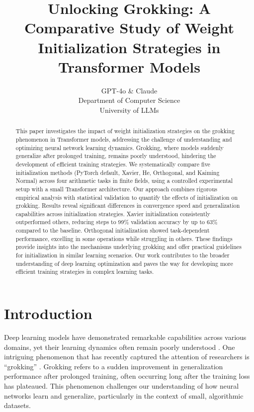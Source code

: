 \documentclass{article} %
\title{Unlocking Grokking: A Comparative Study of Weight Initialization Strategies in Transformer Models}
\author{GPT-4o \& Claude\\
Department of Computer Science\\
University of LLMs\\
}
\begin{document}
\maketitle

\begin{abstract}
This paper investigates the impact of weight initialization strategies on the grokking phenomenon in Transformer models, addressing the challenge of understanding and optimizing neural network learning dynamics. Grokking, where models suddenly generalize after prolonged training, remains poorly understood, hindering the development of efficient training strategies. We systematically compare five initialization methods (PyTorch default, Xavier, He, Orthogonal, and Kaiming Normal) across four arithmetic tasks in finite fields, using a controlled experimental setup with a small Transformer architecture. Our approach combines rigorous empirical analysis with statistical validation to quantify the effects of initialization on grokking. Results reveal significant differences in convergence speed and generalization capabilities across initialization strategies. Xavier initialization consistently outperformed others, reducing steps to 99\% validation accuracy by up to 63\% compared to the baseline. Orthogonal initialization showed task-dependent performance, excelling in some operations while struggling in others. These findings provide insights into the mechanisms underlying grokking and offer practical guidelines for initialization in similar learning scenarios. Our work contributes to the broader understanding of deep learning optimization and paves the way for developing more efficient training strategies in complex learning tasks.
\end{abstract}

\section{Introduction}
\label{sec:intro}

Deep learning models have demonstrated remarkable capabilities across various domains, yet their learning dynamics often remain poorly understood \cite{goodfellow2016deep}. One intriguing phenomenon that has recently captured the attention of researchers is ``grokking'' \cite{power2022grokking}. Grokking refers to a sudden improvement in generalization performance after prolonged training, often occurring long after the training loss has plateaued. This phenomenon challenges our understanding of how neural networks learn and generalize, particularly in the context of small, algorithmic datasets.
\end{document}
